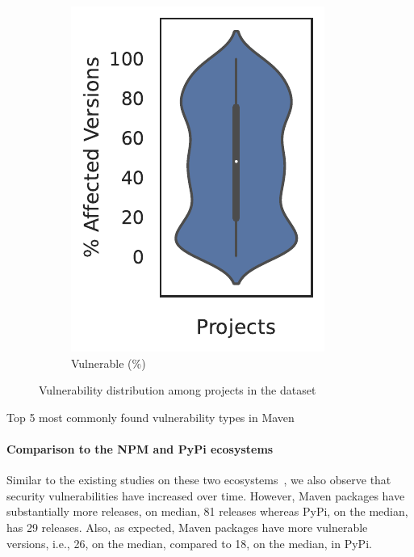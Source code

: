 \begin{figure}
\begin{subfigure}{0.31\columnwidth}
	\includegraphics[width=\textwidth]{chapters/ch3/figs/no_affected_vers_in_pkgs.pdf}
	\caption{Vulnerable (\%)}
	\label{ch3:fig:dist_per_affec_vers}
\end{subfigure}
\caption{Vulnerability distribution among projects in the dataset}
\label{fig:dist_vuln_pkgs}
\end{figure}

\begin{table}
    \centering
    \caption{Top 5 most commonly found vulnerability types in Maven}
    \label{ch3:tab:vuln_cwe_dist}
    
\end{table}

\paragraph{Comparison to the NPM and PyPi ecosystems} Similar to the existing studies on these two ecosystems~\cite{alfadel2021empirical,decan2018impact}, we also observe that security vulnerabilities have increased over time. However, Maven packages have substantially more releases, on median, 81 releases whereas PyPi, on the median, has 29 releases. Also, as expected, Maven packages have more vulnerable versions, i.e., 26, on the median, compared to 18, on the median, in PyPi.

